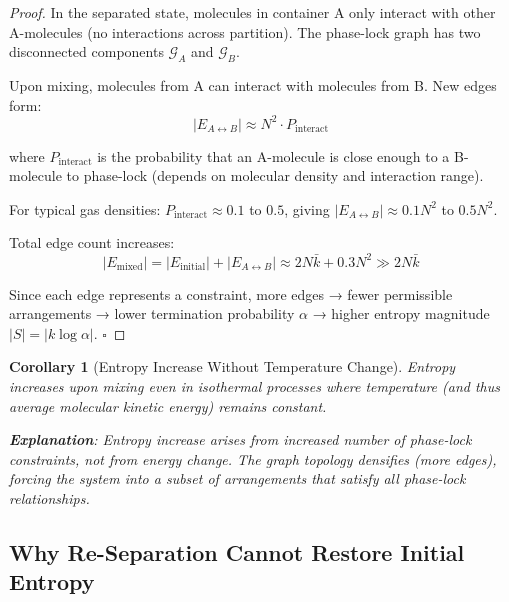 \documentclass[12pt,a4paper]{article}
\newtheorem{corollary}[theorem]{Corollary}
\theoremstyle{remark}
\begin{document}
\begin{proof}
In the separated state, molecules in container A only interact with other A-molecules (no interactions across partition). The phase-lock graph has two disconnected components $\mathcal{G}_A$ and $\mathcal{G}_B$.

Upon mixing, molecules from A can interact with molecules from B. New edges form:
\begin{equation}
|E_{A \leftrightarrow B}| \approx N^2 \cdot P_{\text{interact}}
\end{equation}

where $P_{\text{interact}}$ is the probability that an A-molecule is close enough to a B-molecule to phase-lock (depends on molecular density and interaction range).

For typical gas densities: $P_{\text{interact}} \approx 0.1$ to $0.5$, giving $|E_{A \leftrightarrow B}| \approx 0.1N^2$ to $0.5N^2$.

Total edge count increases:
\begin{equation}
|E_{\text{mixed}}| = |E_{\text{initial}}| + |E_{A \leftrightarrow B}| \approx 2N\bar{k} + 0.3N^2 \gg 2N\bar{k}
\end{equation}

Since each edge represents a constraint, more edges → fewer permissible arrangements → lower termination probability $\alpha$ → higher entropy magnitude $|S| = |k \log \alpha|$. $\square$
\end{proof}

\begin{corollary}[Entropy Increase Without Temperature Change]
\label{cor:isothermal_entropy_increase}
Entropy increases upon mixing even in isothermal processes where temperature (and thus average molecular kinetic energy) remains constant.

\textbf{Explanation}: Entropy increase arises from increased number of phase-lock constraints, not from energy change. The graph topology densifies (more edges), forcing the system into a subset of arrangements that satisfy all phase-lock relationships.
\end{corollary}

\subsection{Why Re-Separation Cannot Restore Initial Entropy}
\end{document}
